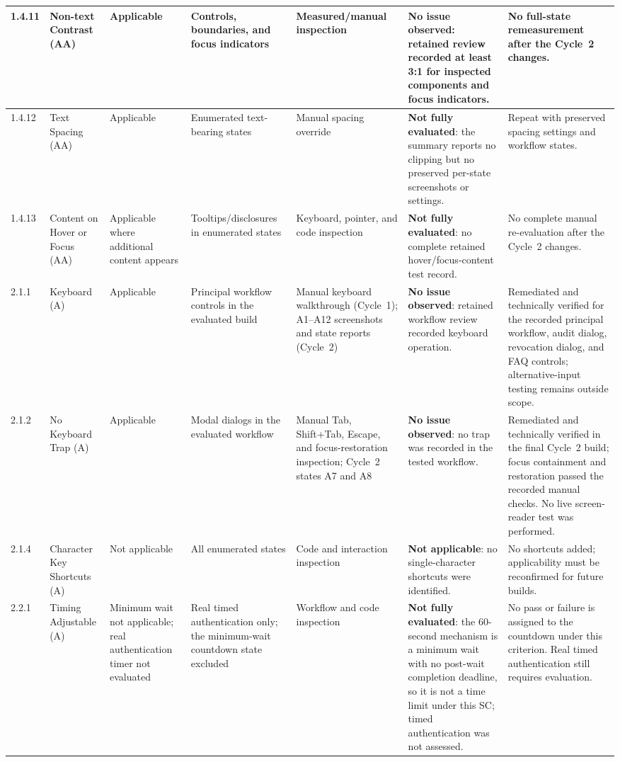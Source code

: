 \documentclass[10pt]{article}
\begin{document}
\begin{landscape}
{\begin{longtable}{|p{1.0cm}|p{3.3cm}|p{1.9cm}|p{2.7cm}|p{2.5cm}|p{4.1cm}|p{4.1cm}|}
1.4.11 & Non-text Contrast (AA) & Applicable & Controls, boundaries, and focus indicators & Measured/manual inspection & \textbf{No issue observed}: retained review recorded at least 3:1 for inspected components and focus indicators. & No full-state remeasurement after the Cycle~2 changes.\\\hline
1.4.12 & Text Spacing (AA) & Applicable & Enumerated text-bearing states & Manual spacing override & \textbf{Not fully evaluated}: the summary reports no clipping but no preserved per-state screenshots or settings. & Repeat with preserved spacing settings and workflow states.\\\hline
1.4.13 & Content on Hover or Focus (AA) & Applicable where additional content appears & Tooltips/disclosures in enumerated states & Keyboard, pointer, and code inspection & \textbf{Not fully evaluated}: no complete retained hover/focus-content test record. & No complete manual re-evaluation after the Cycle~2 changes.\\\hline
2.1.1 & Keyboard (A) & Applicable & Principal workflow controls in the evaluated build & Manual keyboard walkthrough (Cycle~1); A1--A12 screenshots and state reports (Cycle~2) & \textbf{No issue observed}: retained workflow review recorded keyboard operation. & Remediated and technically verified for the recorded principal workflow, audit dialog, revocation dialog, and FAQ controls; alternative-input testing remains outside scope.\\\hline
2.1.2 & No Keyboard Trap (A) & Applicable & Modal dialogs in the evaluated workflow & Manual Tab, Shift+Tab, Escape, and focus-restoration inspection; Cycle~2 states A7 and A8 & \textbf{No issue observed}: no trap was recorded in the tested workflow. & Remediated and technically verified in the final Cycle~2 build; focus containment and restoration passed the recorded manual checks. No live screen-reader test was performed.\\\hline
2.1.4 & Character Key Shortcuts (A) & Not applicable & All enumerated states & Code and interaction inspection & \textbf{Not applicable}: no single-character shortcuts were identified. & No shortcuts added; applicability must be reconfirmed for future builds.\\\hline
2.2.1 & Timing Adjustable (A) & Minimum wait not applicable; real authentication timer not evaluated & Real timed authentication only; the minimum-wait countdown state excluded & Workflow and code inspection & \textbf{Not fully evaluated}: the 60-second mechanism is a minimum wait with no post-wait completion deadline, so it is not a time limit under this SC; timed authentication was not assessed. & No pass or failure is assigned to the countdown under this criterion. Real timed authentication still requires evaluation.\\\hline

\end{longtable}}
\end{landscape}
\end{document}
